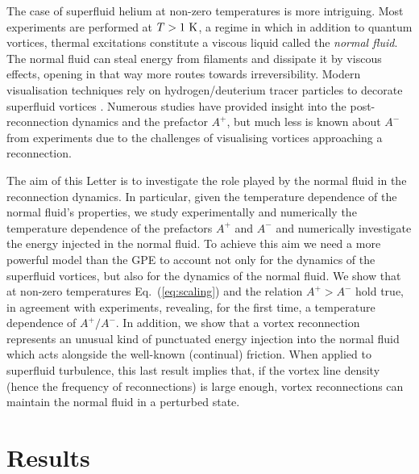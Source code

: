 \documentclass[9pt,twocolumn,twoside]{pnas-new}
\begin{document}
The case of superfluid helium at non-zero temperatures
is more intriguing. Most experiments are performed at $T>1~\rm K$, a regime in which in addition to quantum vortices, thermal excitations constitute a viscous liquid called the {\it normal fluid}. The normal fluid can steal energy from filaments and dissipate it by viscous effects, opening in that way more routes towards irreversibility. Modern visualisation techniques rely on hydrogen/deuterium tracer particles to decorate superfluid vortices \cite{paoletti2008velocity,bewley2008,guo2014visualization,perettiDirectVisualizationQuantum2023}. Numerous studies have provided insight into the post-reconnection dynamics and the prefactor $A^{+}$, but much less is known about $A^-$ from experiments due to the challenges of visualising vortices approaching a reconnection.

The aim of this Letter is to investigate the role played by the normal fluid in the reconnection dynamics. In particular, given the temperature dependence of the normal fluid's properties, we study experimentally and numerically the temperature dependence of the prefactors $A^+$ and $A^-$ and numerically investigate the energy injected in the normal fluid. 
%
To achieve this aim we need a more powerful model than the GPE to account not only for the dynamics of the
superfluid vortices, but also for the dynamics of the normal fluid. 
We show that at non-zero temperatures Eq.~(\ref{eq:scaling}) and the
relation $A^+>A^-$ hold true, in agreement with experiments, revealing, for the 
first time, a temperature dependence of $A^+/A^-$. In addition, we
show that a vortex
reconnection represents an unusual kind of
punctuated energy injection into the normal fluid which acts alongside
the well-known (continual) friction.
When applied to superfluid turbulence, this last result implies that,
if the vortex line density (hence the frequency of reconnections) is large enough, vortex reconnections can maintain the normal fluid in a perturbed state.


\section*{Results}
\end{document}

